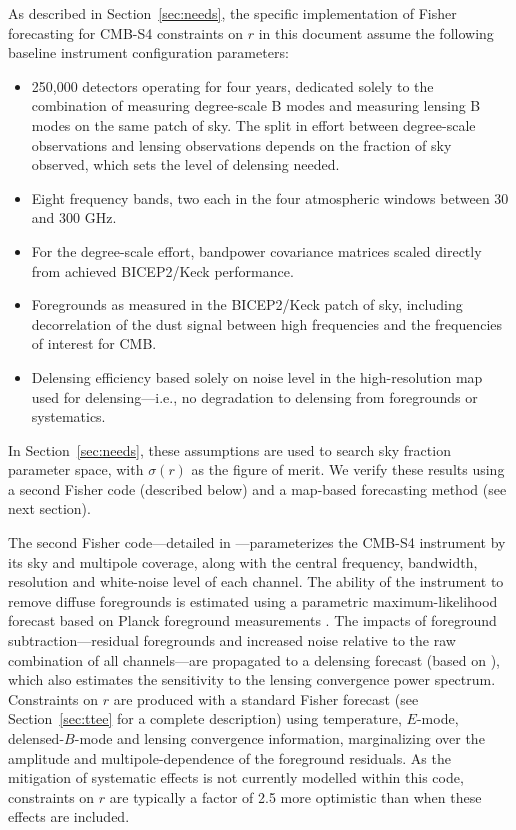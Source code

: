 As described in Section~\ref{sec:needs}, the specific implementation of Fisher forecasting for CMB-S4 constraints
on $r$ in this document assume the following baseline instrument configuration parameters:
%
\begin{itemize}
\item{250,000 detectors operating for four years, dedicated solely to the combination of measuring degree-scale B modes and measuring lensing B modes on the same patch of sky. The split in effort between degree-scale observations and lensing observations depends on the fraction of sky observed, which sets the level of delensing needed.}
\item{Eight frequency bands, two each in the four atmospheric windows between 30 and 300 GHz.}
\item{For the degree-scale effort, bandpower covariance matrices scaled directly from achieved BICEP2/Keck performance.}
\item{Foregrounds as measured in the BICEP2/Keck patch of sky, including decorrelation of the dust signal between high frequencies and the frequencies of interest for CMB.}
\item{Delensing efficiency based solely on noise level in the high-resolution map used for delensing---i.e., no degradation to delensing from foregrounds or systematics.}
\end{itemize}
%
In Section~\ref{sec:needs}, these assumptions are used to search sky fraction parameter space, with 
$\sigma(r)$ as the figure of merit. We verify these results using a second Fisher code (described below) and a map-based
forecasting method (see next section).

The second Fisher code---detailed in \cite{Errard:2015cxa}---parameterizes the CMB-S4 instrument by its sky and multipole coverage, along with the central frequency, bandwidth, resolution and white-noise level of each channel. The ability of the instrument to remove diffuse foregrounds is estimated using a parametric maximum-likelihood forecast \cite{Errard:2011vi,Errard:2012qx} based on Planck foreground measurements \cite{Adam:2015tpy,Adam:2015wua}. The impacts of foreground subtraction---residual foregrounds and increased noise relative to the raw combination of all channels---are propagated to a delensing forecast (based on \cite{Smith:2010gu}), which also estimates the sensitivity to the lensing convergence power spectrum. Constraints on $r$ are produced with a standard Fisher forecast (see Section~\ref{sec:ttee} for a complete description) using temperature, $E$-mode, delensed-$B$-mode and lensing convergence information, marginalizing over the amplitude and multipole-dependence of the foreground residuals. As the mitigation of systematic effects is not currently modelled within this code, constraints on $r$ are typically a factor of 2.5 more optimistic than when these effects are included.

